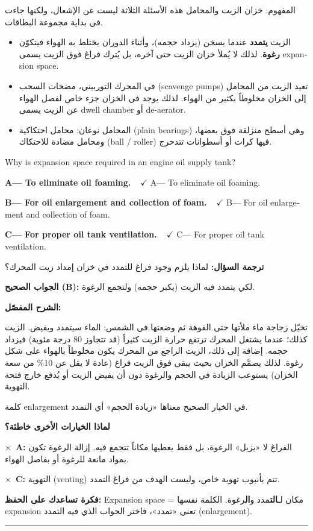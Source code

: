 \documentclass[11pt,a4paper]{article}
\newcommand{\en}[1]{\textenglish{#1}}
\newcommand{\correctletter}{}
\newcommand{\opt}[2]{%
  \ifdefstring{\correctletter}{#1}%
    {\textcolor{ansgreen}{\textbf{#1— #2\ \ $\checkmark$}}}%
    {#1— #2}\par}
\newcommand{\Q}[6]{%
  \renewcommand{\correctletter}{#6}%
  \par\bigskip
  \phantomsection\label{q#1}%
  \begin{tcolorbox}[enhanced,breakable,colback=qback,colframe=qframe,
      arc=2mm,boxrule=0.8pt,fonttitle=\bfseries,
      title={\en{Question #1}}]
    \begin{english}
      #2\par\smallskip
      \opt{A}{#3}\opt{B}{#4}\opt{C}{#5}
    \end{english}
  \end{tcolorbox}}
\newcommand{\tr}[1]{\textbf{\textcolor{qframe}{ترجمة السؤال:}} #1\par}
\newcommand{\ans}[2]{%
  \begin{tcolorbox}[colback=ansback,colframe=ansgreen,boxrule=0.6pt,arc=1.5mm,
      left=4pt,right=4pt,top=2pt,bottom=2pt]
    \textbf{\textcolor{ansgreen}{الجواب الصحيح (\en{#1}):}} #2
  \end{tcolorbox}}
\newcommand{\sharh}[1]{\textbf{\textcolor{conceptc}{الشرح المفصّل:}}\par #1\par}
\newcommand{\nohead}{\textbf{\textcolor{wrongc}{لماذا الخيارات الأخرى خاطئة؟}}\par}
\newcommand{\no}[2]{\hspace*{1em}\textcolor{wrongc}{$\times$}\ \textbf{\en{#1}:} #2\par}
\newcommand{\tip}[1]{%
  \begin{tcolorbox}[colback=tipback,colframe=tipframe,boxrule=0.5pt,arc=1.5mm,
      left=4pt,right=4pt,top=2pt,bottom=2pt]
    \textbf{فكرة تساعدك على الحفظ:} #1
  \end{tcolorbox}}
\newcommand{\qsep}{\par\medskip\noindent\textcolor{qframe!40}{\rule{\linewidth}{0.4pt}}\par}
\begin{document}
\begin{concept}{المفهوم: خزان الزيت والمحامل}
هذه الأسئلة الثلاثة ليست عن الإشعال، ولكنها جاءت في بداية مجموعة البطاقات.
\begin{itemize}
  \item الزيت \textbf{يتمدد} عندما يسخن (يزداد حجمه)، وأثناء الدوران يختلط به الهواء فيتكوّن \textbf{رغوة}. لذلك لا يُملأ خزان الزيت حتى آخره، بل يُترك فراغ فوق الزيت يسمى \en{expansion space}.
  \item في المحرك التوربيني، مضخات السحب (\en{scavenge pumps}) تعيد الزيت من المحامل إلى الخزان مخلوطاً بكثير من الهواء. لذلك يوجد في الخزان جزء خاص لفصل الهواء عن الزيت يسمى \en{dwell chamber} أو \en{de-aerator}.
  \item المحامل نوعان: محامل احتكاكية (\en{plain bearings}) وهي أسطح منزلقة فوق بعضها، ومحامل مضادة للاحتكاك (\en{ball / roller}) فيها كرات أو أسطوانات تتدحرج.
\end{itemize}
\end{concept}

\Q{8500}{Why is expansion space required in an engine oil supply tank?}
{To eliminate oil foaming.}
{For oil enlargement and collection of foam.}
{For proper oil tank ventilation.}{B}
\tr{لماذا يلزم وجود فراغ للتمدد في خزان إمداد زيت المحرك؟}
\ans{B}{لكي يتمدد فيه الزيت (يكبر حجمه) ولتجمع الرغوة.}
\sharh{تخيّل زجاجة ماء ملأتها حتى الفوهة ثم وضعتها في الشمس: الماء سيتمدد ويفيض. الزيت كذلك؛ عندما يشتغل المحرك ترتفع حرارة الزيت كثيراً (قد تتجاوز 80 درجة مئوية) فيزداد حجمه. إضافة إلى ذلك، الزيت الراجع من المحرك يكون مخلوطاً بالهواء على شكل رغوة. لذلك يصمَّم الخزان بحيث يبقى فوق الزيت فراغ (عادة لا يقل عن 10\% من سعة الخزان) يستوعب الزيادة في الحجم والرغوة دون أن يفيض الزيت أو يُدفع خارج فتحة التهوية.

كلمة \en{enlargement} في الخيار الصحيح معناها «زيادة الحجم» أي التمدد.}
\nohead
\no{A}{الفراغ لا «يزيل» الرغوة، بل فقط يعطيها مكاناً تتجمع فيه. إزالة الرغوة تكون بمواد مانعة للرغوة أو بفاصل الهواء.}
\no{C}{التهوية (\en{venting}) تتم بأنبوب تهوية خاص، وليست الهدف من فراغ التمدد.}
\tip{\en{Expansion space} = مكان لـ\textbf{الت}مدد و\textbf{ال}رغوة. الكلمة نفسها \en{expansion} تعني «تمدد»، فاختر الجواب الذي فيه التمدد (\en{enlargement}).}
\qsep
\end{document}
